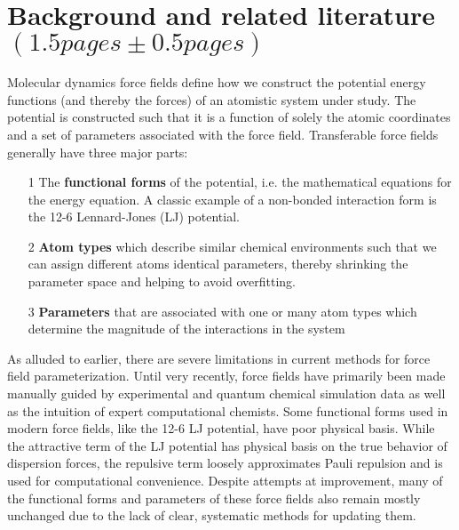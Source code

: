 \documentclass[rmp,nofootinbib,superscriptaddress,12pt,tightenlines,notitlepage]{revtex4-1}
\begin{document}
\section{Background and related literature $\left(1.5 pages \pm 0.5 pages\right)$}
Molecular dynamics force fields define how we construct the potential energy functions (and thereby the forces) of an atomistic system under study. The potential is constructed such that it is a function of solely the atomic coordinates and a set of parameters associated with the force field. Transferable force fields generally have three major parts: 
  \begin{itemize}
   \item [1] The \textbf{functional forms} of the potential, i.e. the mathematical equations for the energy equation. A classic example of a non-bonded interaction form is the 12-6 Lennard-Jones (LJ) potential.  
   \item [2] \textbf{Atom types} which describe similar chemical environments such that we can assign different atoms identical parameters, thereby shrinking the parameter space and helping to avoid overfitting.
   \item [3] \textbf{Parameters} that are associated with one or many atom types which determine the magnitude of the interactions in the system 
  \end{itemize}

As alluded to earlier, there are severe limitations in current methods for force field parameterization. Until very recently, force fields have primarily been made manually guided by experimental and quantum chemical simulation data as well as the intuition of expert computational chemists.\cite{charmm1,charmm2,mm2,mmff,amber} Some functional forms used in modern force fields, like the 12-6 LJ potential, have poor physical basis. While the attractive term of the LJ potential has physical basis on the true behavior of dispersion forces, the repulsive term loosely approximates Pauli repulsion and is used for computational convenience. Despite attempts at improvement, many of the functional forms and parameters of these force fields also remain mostly unchanged due to the lack of clear, systematic methods for updating them.\cite{unchanged}
\end{document}
